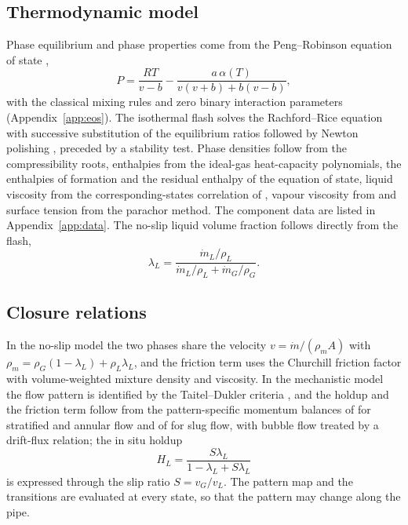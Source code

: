 \documentclass[a4paper,fleqn]{cas-sc}
\newcommand{\mdot}{\dot{m}}
\begin{document}
\subsection{Thermodynamic model}\label{sec:thermo}

Phase equilibrium and phase properties come from the Peng--Robinson equation of state \citep{peng1976},
\begin{equation}\label{eq:pr}
P = \frac{RT}{v - b} - \frac{a\,\alpha(T)}{v(v + b) + b(v - b)},
\end{equation}
with the classical mixing rules and zero binary interaction parameters (Appendix~\ref{app:eos}). The isothermal flash solves the Rachford--Rice equation \citep{rachford1952} with successive substitution of the equilibrium ratios followed by Newton polishing \citep{michelsen1982a,michelsen1982b}, preceded by a stability test. Phase densities follow from the compressibility roots, enthalpies from the ideal-gas heat-capacity polynomials, the enthalpies of formation and the residual enthalpy of the equation of state, liquid viscosity from the corresponding-states correlation of \citet{allan1991}, vapour viscosity from \citet{pedersen1987} and surface tension from the parachor method. The component data are listed in Appendix~\ref{app:data}. The no-slip liquid volume fraction follows directly from the flash,
\begin{equation}\label{eq:lambda}
\lambda_L = \frac{\mdot_L/\rho_L}{\mdot_L/\rho_L + \mdot_G/\rho_G}.
\end{equation}

\subsection{Closure relations}\label{sec:closures}

In the no-slip model the two phases share the velocity $v = \mdot/(\rho_m A)$ with $\rho_m = \rho_G(1-\lambda_L) + \rho_L\lambda_L$, and the friction term uses the Churchill friction factor \citep{churchill1977} with volume-weighted mixture density and viscosity. In the mechanistic model the flow pattern is identified by the Taitel--Dukler criteria \citep{taitel1976,taitel1980}, and the holdup and the friction term follow from the pattern-specific momentum balances of \citet{xiao1990} for stratified and annular flow and of \citet{gomez2000} for slug flow, with bubble flow treated by a drift-flux relation; the in situ holdup
\begin{equation}\label{eq:holdup}
H_L = \frac{S\lambda_L}{1 - \lambda_L + S\lambda_L}
\end{equation}
is expressed through the slip ratio $S = v_G/v_L$. The pattern map and the transitions are evaluated at every state, so that the pattern may change along the pipe.
\end{document}
